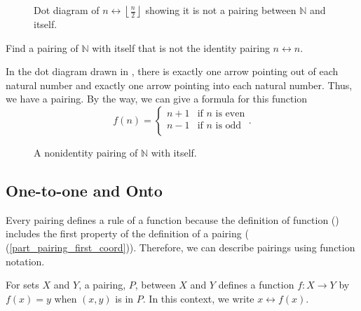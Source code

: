 \begin{exam}
\begin{apart}
\begin{figure}[hbtp]
                    
                    \caption{Dot diagram of $n \leftrightarrow \left\lfloor \frac{n}{2} \right\rfloor$ showing it is not a pairing between $\mathbb{N}$ and itself.}
                    \label{fig_not_pairing_floorofhalf}
                \end{figure}
            \item Find a pairing of $\mathbb{N}$ with itself that is not the identity pairing $n \leftrightarrow n$.  
                \begin{soln}
                    In the dot diagram drawn in , there is exactly one arrow pointing out of each natural number and exactly one arrow pointing into each natural number.  Thus, we have a pairing.  By the way, we can give a formula for this function
                        $$f(n) = \left\{ \begin{array} {cc} 
                        n+1 & \text{if } n \text{ is even} \\
                        n-1 & \text{if } n \text{ is odd} \\
                        \end{array} \right..$$
                \end{soln}
            \begin{figure}[htbp]
                \centering
                
                \caption{A nonidentity pairing of $\mathbb{N}$ with itself.}
                \label{fig_nonid_pair_naturals}
            \end{figure}
    \end{apart}
\end{exam}


\newcommand{\subonetooneonto}{One-to-one and Onto}
\subsection{\subonetooneonto}
\label{sub_onetoone_onto}

Every pairing defines a rule of a function because the definition of function () includes the first property of the definition of a pairing ( (\ref{part_pairing_first_coord})).  Therefore, we can describe pairings using function notation. 

\begin{rem} 
\label{rem_fn_notation_pairing}
    For sets $X$ and $Y$, a pairing, $P$, between $X$ and $Y$ defines a function $f:X \to Y$ by $f(x)=y$ when $(x,y)$ is in $P$.  In this context, we write $x \leftrightarrow f(x)$. 
\end{rem}

